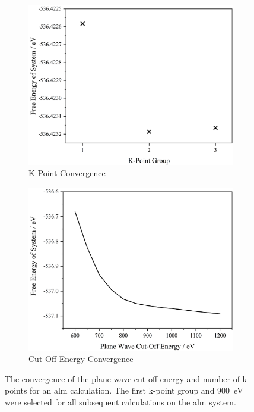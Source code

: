 \begin{figure}
\begin{subfigure}{1\textwidth}
    \centering
    \includegraphics[scale=0.4]{Figures/Misc/IVDW/KPTConG.png}
    \caption{K-Point Convergence}
    \label{fig:kpt_convergence}
    \vspace{10 mm}
\end{subfigure}
\vspace{10 mm}
\begin{subfigure}{1\textwidth}
    \centering
    \includegraphics[scale=0.4]{Figures/Misc/IVDW/CutOffEConG.png}
    \caption{Cut-Off Energy Convergence}
    \label{fig:EC_convergence}
\end{subfigure}
\captionsetup{font = footnotesize, justification = centering}
\caption[The Convergence of the Plane Wave Cut-Off Energy and Number of K-points]{The convergence of the plane wave cut\nobreakdash-off energy and number of k\nobreakdash-points for an \acrshort{alm} calculation. The first k\nobreakdash-point group and \SI{900}{eV} were selected for all subsequent calculations on the \acrshort{alm} system.}
\label{fig:convergence_params}
\end{figure}

